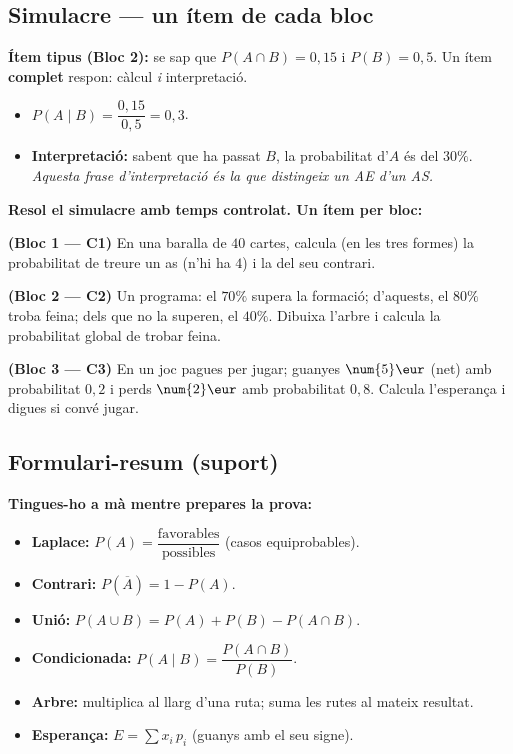 \subsection{Simulacre — un ítem de cada bloc}

\begin{exemple}
\textbf{Ítem tipus (Bloc 2):} se sap que $P(A\cap B)=0,15$ i $P(B)=0,5$. Un ítem
\textbf{complet} respon: càlcul \emph{i} interpretació.
\begin{itemize}[leftmargin=1.4em, itemsep=1pt]
  \item $P(A\mid B)=\dfrac{0,15}{0,5}=0,3$.
  \item \textbf{Interpretació:} sabent que ha passat $B$, la probabilitat d'$A$ és del
        $30\%$. \emph{Aquesta frase d'interpretació és la que distingeix un AE d'un AS.}
\end{itemize}
\end{exemple}

\begin{exercicis}
\textbf{Resol el simulacre amb temps controlat. Un ítem per bloc:}
\begin{exlist}
  \item \textbf{(Bloc 1 — C1)} En una baralla de $40$ cartes, calcula (en les tres
        formes) la probabilitat de treure un as (n'hi ha $4$) i la del seu contrari.
  \item \textbf{(Bloc 2 — C2)} Un programa: el $70\%$ supera la formació; d'aquests, el
        $80\%$ troba feina; dels que no la superen, el $40\%$. Dibuixa l'arbre i calcula
        la probabilitat global de trobar feina.
  \item \textbf{(Bloc 3 — C3)} En un joc pagues per jugar; guanyes $\num{5}\eur$ (net)
        amb probabilitat $0,2$ i perds $\num{2}\eur$ amb probabilitat $0,8$. Calcula
        l'esperança i digues si convé jugar.
\end{exlist}
\end{exercicis}

\subsection{Formulari-resum (suport)}

\begin{idea}
\textbf{Tingues-ho a mà mentre prepares la prova:}
\begin{itemize}[leftmargin=1.4em, itemsep=2pt]
  \item \textbf{Laplace:} $P(A)=\dfrac{\text{favorables}}{\text{possibles}}$ (casos
        equiprobables).
  \item \textbf{Contrari:} $P(\overline{A})=1-P(A)$.
  \item \textbf{Unió:} $P(A\cup B)=P(A)+P(B)-P(A\cap B)$.
  \item \textbf{Condicionada:} $P(A\mid B)=\dfrac{P(A\cap B)}{P(B)}$.
  \item \textbf{Arbre:} multiplica al llarg d'una ruta; suma les rutes al mateix
        resultat.
  \item \textbf{Esperança:} $E=\sum x_i\, p_i$ (guanys amb el seu signe).
\end{itemize}
\end{idea}

